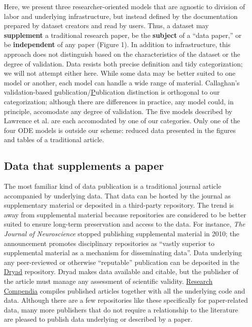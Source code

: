 \documentclass[10pt,a4paper,twocolumn]{article}
\begin{document}
Here, we present three researcher-oriented models that are agnostic to division of labor and underlying infrastructure, but instead defined by the documentation prepared by dataset creators and read by users.
Thus, a dataset may \textbf{supplement} a traditional research paper, be the \textbf{subject} of a ``data paper,'' or be \textbf{independent} of any paper (Figure 1).
In addition to infrastructure, this approach does not distinguish based on the characteristics of the dataset or the degree of validation.
Data resists both precise definition and tidy categorization; we will not attempt either here.
While some data may be better suited to one model or another, each model can handle a wide range of material.
Callaghan's validation-based \underline{p}ublication/\underline{P}ublication distinction\cite{sarah_callaghan_making_2012} is orthogonal to our categorization; although there are differences in practice, any model could, in principle, accomodate any degree of validation.
The five models described by Lawrence et al.\cite{lawrence_data_2011} are each accomodated by one of our categories.
Only one of the four ODE models is outside our scheme: reduced data presented in the figures and tables of a traditional article\cite{reilly_report_2011}.

\subsection*{Data that supplements a paper}\label{paper-supplement-data}

The most familiar kind of data publication is a traditional journal article accompanied by underlying data.
That data can be hosted by the journal as supplementary material or deposited in a third-party repository.
The trend is away from supplemental material because repositories are considered to be better suited to ensure long-term preservation and access to the data.
For instance, \emph{The Journal of Neuroscience} stopped publishing supplemental material in 2010; the announcement promotes disciplinary repositories as ``vastly superior to supplemental material as a mechanism for disseminating data''\cite{maunsell_announcement_2010}.
Data underlying any peer-reviewed or otherwise ``reputable'' publication can be deposited in the \href{http://datadryad.org/}{Dryad} repository.
Dryad makes data available and citable, but the publisher of the article must manage any assessment of scientific validity.
\href{http://researchcompendia.org/}{Research Compendia} compiles published articles together with all the underlying code and data.
Although there are a few repositories like these specifically for paper-related data, many more publishers that do not require a relationship to the literature are pleased to publish data underlying or described by a paper.
 
\end{document}
